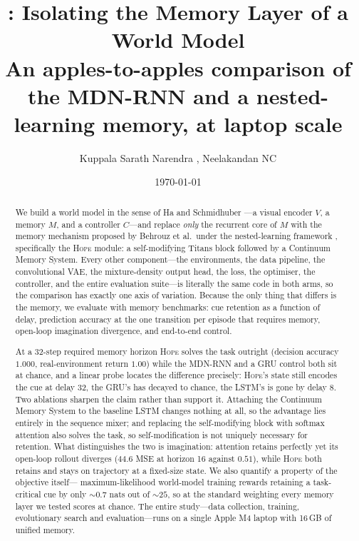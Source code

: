 \documentclass[11pt,a4paper]{article}
\title{\SUP: Isolating the Memory Layer of a World Model\\
       \large An apples-to-apples comparison of the MDN-RNN and a
       nested-learning memory, at laptop scale}
\author{ Kuppala Sarath Narendra , Neelakandan NC}
\date{\today}
\begin{document}
\maketitle

\begin{abstract}
We build a world model in the sense of Ha and Schmidhuber
\cite{ha2018world}---a visual encoder $V$, a memory $M$, and a controller
$C$---and replace \emph{only} the recurrent core of $M$ with the memory
mechanism proposed by Behrouz et al.\ under the nested-learning framework
\cite{behrouz2025nested}, specifically the \textsc{Hope} module: a
self-modifying Titans block followed by a Continuum Memory System. Every other
component---the environments, the data pipeline, the convolutional VAE, the
mixture-density output head, the loss, the optimiser, the controller, and the
entire evaluation suite---is literally the same code in both arms, so the
comparison has exactly one axis of variation. Because the only thing that
differs is the memory, we evaluate with memory benchmarks: cue retention as a
function of delay, prediction accuracy at the one transition per episode that
requires memory, open-loop imagination divergence, and end-to-end control.

At a 32-step required memory horizon \textsc{Hope} solves the task outright
(decision accuracy $1.000$, real-environment return $1.00$) while the MDN-RNN and
a GRU control both sit at chance, and a linear probe locates the difference
precisely: \textsc{Hope}'s state still encodes the cue at delay 32, the GRU's has
decayed to chance, the LSTM's is gone by delay 8. Two ablations sharpen the
claim rather than support it. Attaching the Continuum Memory System to the
baseline LSTM changes nothing at all, so the advantage lies entirely in the
sequence mixer; and replacing the self-modifying block with softmax attention
also solves the task, so self-modification is not uniquely necessary for
retention. What distinguishes the two is imagination: attention retains
perfectly yet its open-loop rollout diverges ($44.6$ MSE at horizon 16 against
$0.51$), while \textsc{Hope} both retains and stays on trajectory at a
fixed-size state. We also quantify a property of the objective itself---
maximum-likelihood world-model training rewards retaining a task-critical cue by
only ${\sim}0.7$ nats out of ${\sim}25$, so at the standard weighting every
memory layer we tested scores at chance. The entire study---data collection,
training, evolutionary search and evaluation---runs on a single Apple M4 laptop
with 16\,GB of unified memory.
\end{abstract}
\end{document}
